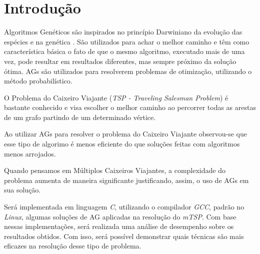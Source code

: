 \documentclass[final,5p,times,twocolumn]{elsarticle}
\begin{document}



\section{Introdução}
		
		Algoritmos Genéticos são inspirados no princípio Darwiniano da evolução das espécies e na genética \cite{0004-pdf}. 
		São utilizados para achar o melhor caminho e têm como característica básica o fato de que o mesmo algoritmo, 
		executado mais de uma vez, pode resultar em resultados diferentes, mas sempre próximo da solução ótima. AGs são utilizados para resolverem problemas de otimização, utilizando o método probabilístico.
	
		O Problema do Caixeiro Viajante (\textit{TSP - Traveling Salesman Problem}) é bastante conhecido e visa escolher o 
		melhor caminho ao percorrer todas as arestas de um grafo partindo de um determinado vértice.

		
		Ao utilizar AGs para resolver o problema do Caixeiro Viajante observou-se que esse tipo de algorimo é menos eficiente 
		do que soluções feitas com algoritmos menos arrojados.
		
		Quando pensamos em Múltiplos Caixeiros Viajantes, a complexidade do problema aumenta de maneira significante justificando, 
		assim, o uso de AGs em sua solução.
		
		
		Será implementada em linguagem \textit{C}, utilizando o compilador \textit{GCC}, padrão no \textit{Linux}, 
		algumas soluções de AG aplicadas na resolução do \textit{mTSP}. Com base nessas implementações, será 
		realizada uma análise de desempenho sobre os resultados obtidos. Com isso, será possível demonstrar quais 
		técnicas são mais eficazes na resolução desse tipo de problema.
		
\end{document}
